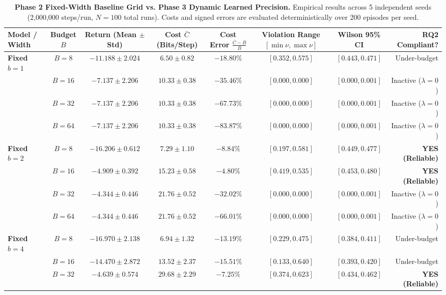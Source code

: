 \documentclass[10pt,twocolumn,letterpaper]{article}
\begin{document}
\begin{table}[t]
\centering
\small
\caption{\textbf{Phase 2 Fixed-Width Baseline Grid vs. Phase 3 Dynamic Learned Precision.} Empirical results across 5 independent seeds (2,000,000 steps/run, $N=100$ total runs). Costs and signed errors are evaluated deterministically over 200 episodes per seed.}
\label{tab:main_results}
\begin{tabular}{lccccccr}
\toprule
\textbf{Model / Width} & \textbf{Budget $B$} & \textbf{Return (Mean $\pm$ Std)} & \textbf{Cost $\bar{C}$ (Bits/Step)} & \textbf{Cost Error} $\frac{\bar{C}-B}{B}$ & \textbf{Violation Range} $[\min \nu, \max \nu]$ & \textbf{Wilson 95\% CI} & \textbf{RQ2 Compliant?} \\
\midrule
\textbf{Fixed $b=1$} & $B=8$ & $-11.188 \pm 2.024$ & $6.50 \pm 0.82$ & $-18.80\%$ & $[0.352, 0.575]$ & $[0.443, 0.471]$ & Under-budget \\
& $B=16$ & $-7.137 \pm 2.206$ & $10.33 \pm 0.38$ & $-35.46\%$ & $[0.000, 0.000]$ & $[0.000, 0.001]$ & Inactive ($\lambda=0$) \\
& $B=32$ & $-7.137 \pm 2.206$ & $10.33 \pm 0.38$ & $-67.73\%$ & $[0.000, 0.000]$ & $[0.000, 0.001]$ & Inactive ($\lambda=0$) \\
& $B=64$ & $-7.137 \pm 2.206$ & $10.33 \pm 0.38$ & $-83.87\%$ & $[0.000, 0.000]$ & $[0.000, 0.001]$ & Inactive ($\lambda=0$) \\
\midrule
\textbf{Fixed $b=2$} & $B=8$ & $-16.206 \pm 0.612$ & $7.29 \pm 1.10$ & \textbf{$-8.84\%$} & $[0.197, 0.581]$ & $[0.449, 0.477]$ & \textbf{YES (Reliable)} \\
& $B=16$ & $\mathbf{-4.909 \pm 0.392}$ & $15.23 \pm 0.58$ & \textbf{$-4.80\%$} & $[0.419, 0.535]$ & $[0.453, 0.480]$ & \textbf{YES (Reliable)} \\
& $B=32$ & $-4.344 \pm 0.446$ & $21.76 \pm 0.52$ & $-32.02\%$ & $[0.000, 0.000]$ & $[0.000, 0.001]$ & Inactive ($\lambda=0$) \\
& $B=64$ & $-4.344 \pm 0.446$ & $21.76 \pm 0.52$ & $-66.01\%$ & $[0.000, 0.000]$ & $[0.000, 0.001]$ & Inactive ($\lambda=0$) \\
\midrule
\textbf{Fixed $b=4$} & $B=8$ & $-16.970 \pm 2.138$ & $6.94 \pm 1.32$ & $-13.19\%$ & $[0.229, 0.475]$ & $[0.384, 0.411]$ & Under-budget \\
& $B=16$ & $-14.470 \pm 2.872$ & $13.52 \pm 2.37$ & $-15.51\%$ & $[0.133, 0.640]$ & $[0.393, 0.420]$ & Under-budget \\
& $B=32$ & $-4.639 \pm 0.574$ & $29.68 \pm 2.29$ & \textbf{$-7.25\%$} & $[0.374, 0.623]$ & $[0.434, 0.462]$ & \textbf{YES (Reliable)} \\

\end{tabular}
\end{table}
\end{document}
